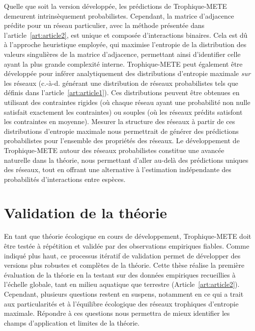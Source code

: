 Quelle que soit la version développée, les prédictions de Trophique-METE
demeurent intrinsèquement probabilistes. Cependant, la matrice d'adjacence
prédite pour un réseau particulier, avec la méthode présentée dans
l'article~\ref{art:article2}, est unique et composée d'interactions binaires.
Cela est dû à l'approche heuristique employée, qui maximise l'entropie de la
distribution des valeurs singulières de la matrice d'adjacence, permettant ainsi
d'identifier celle ayant la plus grande complexité interne. Trophique-METE peut
également être développée pour inférer analytiquement des distributions
d'entropie maximale \textit{sur} les réseaux (c.-à-d. générant une distribution
de réseaux probabilistes tels que définis dans l'article~\ref{art:article1}).
Ces distributions peuvent être obtenues en utilisant des contraintes rigides (où
chaque réseau ayant une probabilité non nulle satisfait exactement les
contraintes) ou souples (où les réseaux prédits satisfont les contraintes en
moyenne). Mesurer la structure des réseaux à partir de ces distributions
d'entropie maximale nous permettrait de générer des prédictions probabilistes
pour l'ensemble des propriétés des réseaux. Le développement de Trophique-METE
autour des réseaux probabilistes constitue une avancée naturelle dans la
théorie, nous permettant d'aller au-delà des prédictions uniques des réseaux,
tout en offrant une alternative à l'estimation indépendante des probabilités
d'interactions entre espèces.  


\section{Validation de la théorie} 

En tant que théorie écologique en cours de développement, Trophique-METE doit
être testée à répétition et validée par des observations empiriques fiables.
Comme indiqué plus haut, ce processus itératif de validation permet de
développer des versions plus robustes et complètes de la théorie. Cette thèse
réalise la première évaluation de la théorie en la testant sur des données
empiriques recueillies à l'échelle globale, tant en milieu aquatique que
terrestre (Article~\ref{art:article2}). Cependant, plusieurs questions restent
en suspens, notamment en ce qui a trait aux particularités et à l'équilibre
écologique des réseaux trophiques d'entropie maximale. Répondre à ces questions
nous permettra de mieux identifier les champs d'application et limites de la
théorie.

